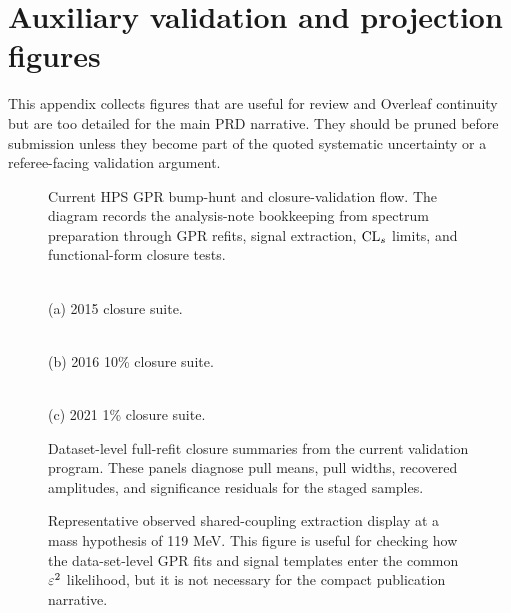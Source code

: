 \section{Auxiliary validation and projection figures}
\label{app:validation-figures}

This appendix collects figures that are useful for review and Overleaf continuity but
are too detailed for the main PRD narrative. They should be pruned before submission
unless they become part of the quoted systematic uncertainty or a referee-facing
validation argument.

\begin{figure}[t]
\centering
{}
\caption{Current HPS GPR bump-hunt and closure-validation flow. The diagram records
the analysis-note bookkeeping from spectrum preparation through GPR refits, signal
extraction, $\mathrm{CL}_{s}$ limits, and functional-form closure tests.}
\label{fig:app-validation-flow}
\end{figure}

\begin{figure}[t]
\centering
\begin{minipage}{0.32\textwidth}
\centering
{}\\
(a) 2015 closure suite.
\end{minipage}
\hfill
\begin{minipage}{0.32\textwidth}
\centering
{}\\
(b) 2016 10\% closure suite.
\end{minipage}
\hfill
\begin{minipage}{0.32\textwidth}
\centering
{}\\
(c) 2021 1\% closure suite.
\end{minipage}
\caption{Dataset-level full-refit closure summaries from the current validation
program. These panels diagnose pull means, pull widths, recovered amplitudes, and
significance residuals for the staged samples.}
\label{fig:app-closure-suites}
\end{figure}

\begin{figure}[t]
\centering
{}
\caption{Representative observed shared-coupling extraction display at a mass
hypothesis of 119 MeV. This figure is useful for checking how the data-set-level GPR
fits and signal templates enter the common $\varepsilon^2$ likelihood, but it is not
necessary for the compact publication narrative.}
\label{fig:app-observed-display}
\end{figure}


